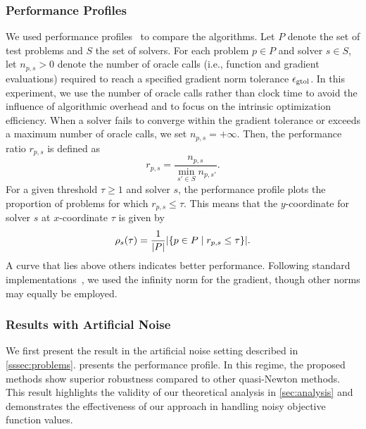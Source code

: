 \documentclass[journal]{subfiles}
\begin{document}


\subsubsection{Performance Profiles}\label{sssec:metrics}

We used performance profiles~\citep{dolanBenchmarkingOptimizationSoftware2002} to compare the algorithms.
Let $P$ denote the set of test problems and $S$ the set of solvers.
For each problem $p \in P$ and solver $s \in S$, let $n_{p,s} > 0$ denote the number of oracle calls (i.e., function and gradient evaluations) required to reach a specified gradient norm tolerance $\epsilon_{\mathrm{gtol}}$.
In this experiment, we use the number of oracle calls rather than clock time to avoid the influence of algorithmic overhead and to focus on the intrinsic optimization efficiency.
When a solver fails to converge within the gradient tolerance or exceeds a maximum number of oracle calls, we set $n_{p,s} = +\infty$.
Then, the performance ratio $r_{p,s}$ is defined as
\begin{equation*}
    r_{p,s} = \frac{n_{p,s}}{\min_{s' \in S} n_{p,s'}}.
\end{equation*}
For a given threshold $\tau \geq 1$ and solver $s$, the performance profile plots the proportion of problems for which $r_{p,s} \leq \tau$. This means that the $y$-coordinate for solver $s$ at $x$-coordinate $\tau$ is given by
\begin{equation*}
    \rho_s(\tau) = \frac{1}{\abs{P}} \abs{\left\{ p \in P \mathrel{}\middle|\mathrel{} r_{p,s} \leq \tau \right\}}.
\end{equation*}
A curve that lies above others indicates better performance.
Following standard implementations~\citep{2020SciPy-NMeth}, we used the infinity norm for the gradient, though other norms may equally be employed.

\subsubsection{Results with Artificial Noise}\label{sssec:noise_results}

We first present the result in the artificial noise setting described in \cref{sssec:problems}.
 presents the performance profile.
In this regime, the proposed methods show superior robustness compared to other quasi-Newton methods.
This result highlights the validity of our theoretical analysis in \cref{sec:analysis} and demonstrates the effectiveness of our approach in handling noisy objective function values.
\end{document}

